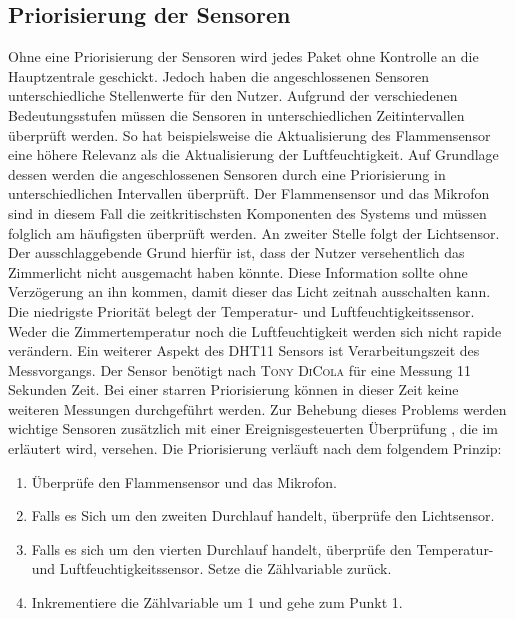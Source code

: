 \subsection{Priorisierung der Sensoren}
Ohne eine Priorisierung der Sensoren wird jedes Paket ohne Kontrolle an die Hauptzentrale geschickt. Jedoch haben die angeschlossenen Sensoren unterschiedliche Stellenwerte für den Nutzer. Aufgrund der verschiedenen Bedeutungsstufen müssen die Sensoren in unterschiedlichen Zeitintervallen überprüft werden. So hat beispielsweise die Aktualisierung des Flammensensor eine höhere Relevanz als die Aktualisierung der Luftfeuchtigkeit. Auf Grundlage dessen werden die angeschlossenen Sensoren durch eine Priorisierung in unterschiedlichen Intervallen überprüft. Der Flammensensor und das Mikrofon sind in diesem Fall die zeitkritischsten Komponenten des Systems und müssen folglich am häufigsten überprüft werden. An zweiter Stelle folgt der Lichtsensor. Der ausschlaggebende Grund hierfür ist, dass  der Nutzer versehentlich das Zimmerlicht nicht ausgemacht haben könnte. Diese Information sollte ohne Verzögerung an ihn kommen, damit dieser das Licht zeitnah ausschalten kann. Die niedrigste Priorität belegt der Temperatur- und Luftfeuchtigkeitssensor. Weder die Zimmertemperatur noch die Luftfeuchtigkeit werden sich nicht rapide verändern. Ein weiterer Aspekt des DHT11 Sensors ist Verarbeitungszeit des Messvorgangs. Der Sensor benötigt nach \textsc{Tony DiCola}\cite{Adafruit47:online} für eine Messung 11 Sekunden Zeit. Bei einer starren Priorisierung können in dieser Zeit keine weiteren Messungen durchgeführt werden. Zur Behebung dieses Problems werden wichtige Sensoren zusätzlich mit einer Ereignisgesteuerten Überprüfung , die im  erläutert wird, versehen. Die Priorisierung verläuft nach dem folgendem Prinzip:
\begin{enumerate}
	\item Überprüfe den Flammensensor und das Mikrofon.
	\item Falls es Sich um den zweiten Durchlauf handelt, überprüfe den Lichtsensor.
	\item  Falls es sich um den vierten Durchlauf handelt, überprüfe den Temperatur- und Luftfeuchtigkeitssensor. Setze die Zählvariable zurück.
	\item Inkrementiere die Zählvariable um 1 und gehe zum Punkt 1.
\end{enumerate} 

